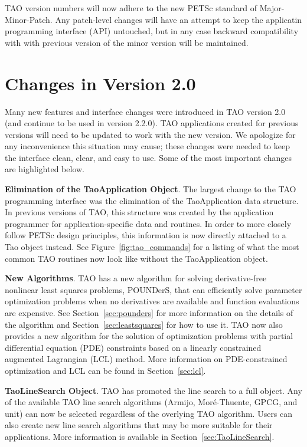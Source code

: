 TAO version numbers will now adhere to the new PETSc standard of 
Major-Minor-Patch. Any patch-level changes will have an attempt to keep the 
applicatin programming interface (API) untouched, but in any case backward 
compatibility with with previous version of the minor version will be 
maintained.
\section*{Changes in Version 2.0}

Many new features and interface changes were introduced in TAO version 2.0 (and continue to be used in version 2.2.0).
TAO applications created for previous versions will need to be updated to 
work with the new version.  We apologize for any inconvenience this situation
may cause; these changes were needed to keep the interface
clean, 
clear, and easy to use. Some of the most important changes are highlighted 
below.

\vspace{7mm}
\noindent \textbf{Elimination of the TaoApplication Object}. The largest change to the TAO programming interface was the elimination of the
TaoApplication data structure. In previous versions of TAO, this structure was 
created by the application programmer for application-specific data and 
routines.  In order to more closely follow PETSc design principles, this 
information is now directly attached to a Tao object instead.  See 
Figure~\ref{fig:tao_commands} for a listing of what the most common TAO 
routines now look like without the TaoApplication object.

\vspace{7mm}
\noindent \textbf{New Algorithms}. TAO has a new algorithm for solving derivative-free nonlinear least
squares
problems, POUNDerS, that can efficiently solve parameter optimization problems 
when no derivatives are available and function evaluations are expensive. 
See 
Section~\ref{sec:pounders} for more information on the details of the 
algorithm and Section~\ref{sec:leastsquares} for how to use it.
TAO now also provides a new algorithm for the solution of optimization
problems with partial differential equation (PDE) constraints based on a
linearly constrained augmented Lagrangian (LCL) method.  More 
information on PDE-constrained optimization and LCL can be found 
in Section~\ref{sec:lcl}.


\vspace{7mm}
\noindent \textbf{TaoLineSearch Object}. TAO has promoted the line search to a full object.  Any of the available 
TAO line search algorithms (Armijo, Mor\'e-Thuente, GPCG, and unit) can now 
be selected regardless of the overlying TAO algorithm.  Users can also
create new line search algorithms that may be more suitable for their
applications.  More information is available in 
Section~\ref{sec:TaoLineSearch}.

